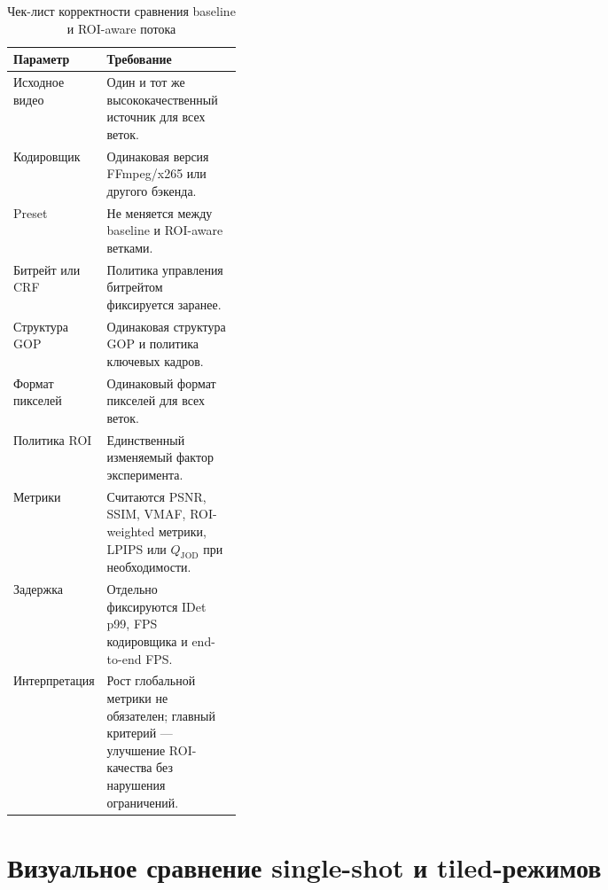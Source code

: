 \documentclass[12pt,a4paper,oneside,openany]{report}
\begin{document}
\begin{table}[H]
\centering
\caption{Чек-лист корректности сравнения baseline и ROI-aware потока}
\label{tab:appendix_encoding_checklist}
\small
\begin{tabularx}{\linewidth}{@{}P{0.30\linewidth}Y@{}}
\toprule

Параметр & Требование \\
\midrule
Исходное видео & Один и тот же высококачественный источник для всех веток. \\
Кодировщик & Одинаковая версия FFmpeg/x265 или другого бэкенда. \\
Preset & Не меняется между baseline и ROI-aware ветками. \\
Битрейт или CRF & Политика управления битрейтом фиксируется заранее. \\
Структура GOP & Одинаковая структура GOP и политика ключевых кадров. \\
Формат пикселей & Одинаковый формат пикселей для всех веток. \\
Политика ROI & Единственный изменяемый фактор эксперимента. \\
Метрики & Считаются PSNR, SSIM, VMAF, ROI-weighted метрики, LPIPS или $Q_{\operatorname{JOD}}$ при необходимости. \\
Задержка & Отдельно фиксируются IDet p99, FPS кодировщика и end-to-end FPS. \\
Интерпретация & Рост глобальной метрики не обязателен; главный критерий --- улучшение ROI-качества без нарушения ограничений. \\
\bottomrule
\end{tabularx}
\end{table}

\clearpage
\renewcommand{\thesection}{D.\arabic{section}}
\setcounter{section}{0}
\setcounter{table}{0}
\setcounter{figure}{0}
\setcounter{lstlisting}{0}
\renewcommand{\thetable}{D.\arabic{table}}
\renewcommand{\thefigure}{D.\arabic{figure}}
\renewcommand{\thelstlisting}{D.\arabic{lstlisting}}
\renewcommand{\theHsection}{appD.\arabic{section}}
\renewcommand{\theHtable}{appD.\arabic{table}}
\renewcommand{\theHfigure}{appD.\arabic{figure}}
\renewcommand{\theHlstlisting}{appD.\arabic{lstlisting}}


\section{Визуальное сравнение single-shot и tiled-режимов}
\end{document}
